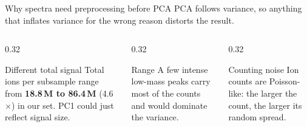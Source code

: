 \documentclass[aspectratio=169,10pt]{beamer}
\newcommand{\hl}[1]{{\color{warm}\bfseries #1}}
\begin{document}
\begin{frame}{Why spectra need preprocessing before PCA}
  PCA follows variance, so anything that inflates variance for the wrong reason distorts the result.
  \vspace{2mm}
  \begin{columns}[T]
    \begin{column}{0.32\textwidth}
      \begin{block}{Different total signal}
        Total ions per subsample range from \hl{18.8\,M to 86.4\,M} (4.6$\times$) in our set. PC1 could just reflect signal size.
      \end{block}
    \end{column}
    \begin{column}{0.32\textwidth}
      \begin{block}{Range}
        A few intense low-mass peaks carry most of the counts and would dominate the variance.
      \end{block}
    \end{column}
    \begin{column}{0.32\textwidth}
      \begin{block}{Counting noise}
        Ion counts are Poisson-like: the larger the count, the larger its random spread.
      \end{block}
    \end{column}
  \end{columns}
  \vspace{4mm}
\end{frame}
\end{document}

